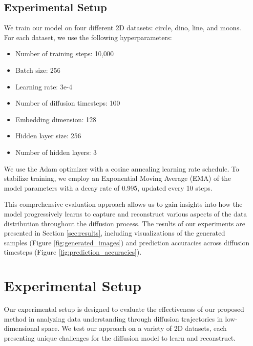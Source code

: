 \documentclass{article} %
\begin{document}
\subsection{Experimental Setup}

We train our model on four different 2D datasets: circle, dino, line, and moons. For each dataset, we use the following hyperparameters:

\begin{itemize}
    \item Number of training steps: 10,000
    \item Batch size: 256
    \item Learning rate: 3e-4
    \item Number of diffusion timesteps: 100
    \item Embedding dimension: 128
    \item Hidden layer size: 256
    \item Number of hidden layers: 3
\end{itemize}

We use the Adam optimizer with a cosine annealing learning rate schedule. To stabilize training, we employ an Exponential Moving Average (EMA) of the model parameters with a decay rate of 0.995, updated every 10 steps.

This comprehensive evaluation approach allows us to gain insights into how the model progressively learns to capture and reconstruct various aspects of the data distribution throughout the diffusion process. The results of our experiments are presented in Section \ref{sec:results}, including visualizations of the generated samples (Figure \ref{fig:generated_images}) and prediction accuracies across diffusion timesteps (Figure \ref{fig:prediction_accuracies}).

\section{Experimental Setup}
\label{sec:experimental}

Our experimental setup is designed to evaluate the effectiveness of our proposed method in analyzing data understanding through diffusion trajectories in low-dimensional space. We test our approach on a variety of 2D datasets, each presenting unique challenges for the diffusion model to learn and reconstruct.
\end{document}
